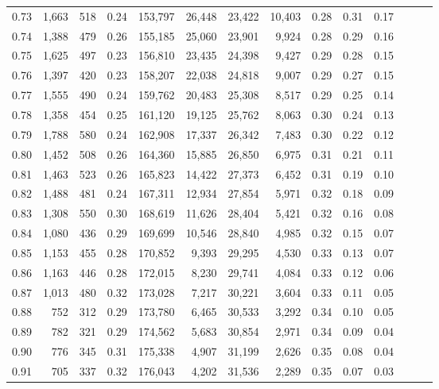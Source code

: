 \begin{tabular}{rrrrrrrrrrrrrr}
0.73 &  1,663 &  518 &  0.24 &  153,797 &   26,448 &  23,422 &  10,403 &  0.28 &  0.31 &      0.17 \\
0.74 &  1,388 &  479 &  0.26 &  155,185 &   25,060 &  23,901 &   9,924 &  0.28 &  0.29 &      0.16 \\
0.75 &  1,625 &  497 &  0.23 &  156,810 &   23,435 &  24,398 &   9,427 &  0.29 &  0.28 &      0.15 \\
0.76 &  1,397 &  420 &  0.23 &  158,207 &   22,038 &  24,818 &   9,007 &  0.29 &  0.27 &      0.15 \\
0.77 &  1,555 &  490 &  0.24 &  159,762 &   20,483 &  25,308 &   8,517 &  0.29 &  0.25 &      0.14 \\
0.78 &  1,358 &  454 &  0.25 &  161,120 &   19,125 &  25,762 &   8,063 &  0.30 &  0.24 &      0.13 \\
0.79 &  1,788 &  580 &  0.24 &  162,908 &   17,337 &  26,342 &   7,483 &  0.30 &  0.22 &      0.12 \\
0.80 &  1,452 &  508 &  0.26 &  164,360 &   15,885 &  26,850 &   6,975 &  0.31 &  0.21 &      0.11 \\
0.81 &  1,463 &  523 &  0.26 &  165,823 &   14,422 &  27,373 &   6,452 &  0.31 &  0.19 &      0.10 \\
0.82 &  1,488 &  481 &  0.24 &  167,311 &   12,934 &  27,854 &   5,971 &  0.32 &  0.18 &      0.09 \\
0.83 &  1,308 &  550 &  0.30 &  168,619 &   11,626 &  28,404 &   5,421 &  0.32 &  0.16 &      0.08 \\
0.84 &  1,080 &  436 &  0.29 &  169,699 &   10,546 &  28,840 &   4,985 &  0.32 &  0.15 &      0.07 \\
0.85 &  1,153 &  455 &  0.28 &  170,852 &    9,393 &  29,295 &   4,530 &  0.33 &  0.13 &      0.07 \\
0.86 &  1,163 &  446 &  0.28 &  172,015 &    8,230 &  29,741 &   4,084 &  0.33 &  0.12 &      0.06 \\
0.87 &  1,013 &  480 &  0.32 &  173,028 &    7,217 &  30,221 &   3,604 &  0.33 &  0.11 &      0.05 \\
0.88 &    752 &  312 &  0.29 &  173,780 &    6,465 &  30,533 &   3,292 &  0.34 &  0.10 &      0.05 \\
0.89 &    782 &  321 &  0.29 &  174,562 &    5,683 &  30,854 &   2,971 &  0.34 &  0.09 &      0.04 \\
0.90 &    776 &  345 &  0.31 &  175,338 &    4,907 &  31,199 &   2,626 &  0.35 &  0.08 &      0.04 \\
0.91 &    705 &  337 &  0.32 &  176,043 &    4,202 &  31,536 &   2,289 &  0.35 &  0.07 &      0.03 \\

\end{tabular}
